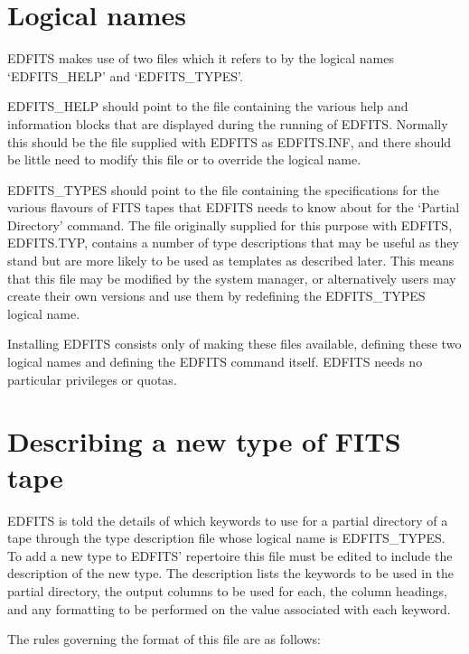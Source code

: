 \section{Logical names}

EDFITS makes use of two files which it refers to by the logical names
`EDFITS\_HELP' and `EDFITS\_TYPES'.

EDFITS\_HELP should point to the file containing the various help and
information blocks that are displayed during the running of EDFITS.  Normally
this should be the file supplied with EDFITS as EDFITS.INF, and there
should be little need to modify this file or to override the logical name.

EDFITS\_TYPES should point to the file containing the specifications for the
various flavours of FITS tapes that EDFITS needs to know about for the
`Partial Directory' command.  The file originally supplied for this
purpose with EDFITS, EDFITS.TYP, contains a number of type descriptions
that may be useful as they stand but are more likely to be used as
templates as described later.  This means that this file may be modified
by the system manager, or alternatively users may create their own versions
and use them by redefining the EDFITS\_TYPES logical name.

Installing EDFITS consists only of making these files available, defining these
two logical names and defining the EDFITS command itself.  EDFITS needs no
particular privileges or quotas.

\section{Describing a new type of FITS tape}

EDFITS is told the details of which keywords to use for a partial directory
of a tape through the type description file whose logical name is EDFITS\_TYPES.
To add a new type to EDFITS' repertoire this file must be edited to include
the description of the new type.  The description lists the keywords to be
used in the partial directory, the output columns to be used for each, the
column headings, and any formatting to be performed on the value associated
with each keyword.

The rules governing the format of this file are as follows:

